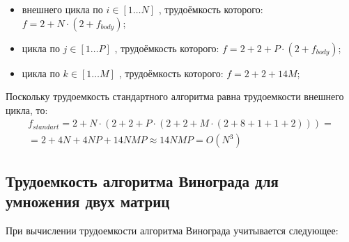 \begin{itemize}[label=---]
	\item внешнего цикла по $i \in [1 \ldots N]$ , трудоёмкость которого: $f = 2 + N \cdot (2 + f_{body})$;
	\item цикла по $j \in [1 \ldots P]$ , трудоёмкость которого: $f = 2 + 2 + P \cdot (2 + f_{body})$;
	\item цикла по $k \in [1 \ldots M]$ , трудоёмкость которого: $f = 2 + 2 + 14M$;
\end{itemize}

Поскольку трудоемкость стандартного алгоритма равна трудоемкости внешнего цикла, то:
\begin{equation}
	\label{eq:classic}
	\begin{gathered}
		f_{standart} = 2 + N \cdot (2 + 2 + P \cdot (2 + 2 + M \cdot (2 + 8 + 1 + 1 + 2)))= \\
		= 2 + 4N + 4NP + 14NMP \approx 14NMP = O(N^3)
	\end{gathered}
\end{equation}

\subsection{Трудоемкость алгоритма Винограда для умножения двух матриц}

При вычислении трудоемкости алгоритма Винограда учитывается следующее:

